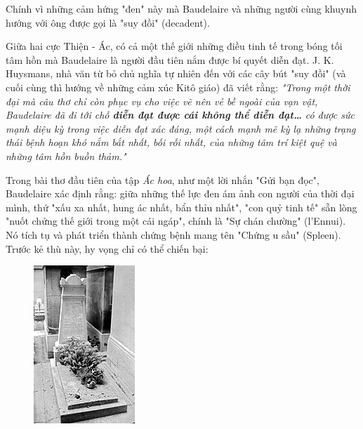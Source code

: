 \documentclass[../main.tex]{subfiles}
\begin{document}
\begin{multicols}{2}
Chính vì những cảm hứng "đen" này mà Baudelaire và những người cùng khuynh hướng với ông được gọi là "suy đồi" (decadent). 
 
Giữa hai cực Thiện - Ác, có cả một thế giới những điều tinh tế trong bóng tối tâm hồn mà Baudelaire là người đầu tiên nắm được bí quyết diễn đạt. J. K. Huysmans, nhà văn từ bỏ chủ nghĩa tự nhiên đến với các cây bút "suy đồi" (và cuối cùng thì hướng về những cảm xúc Kitô giáo) đã viết rằng: \textit{"Trong một thời đại mà câu thơ chỉ còn phục vụ cho việc vẽ nên vẻ bề ngoài của vạn vật, Baudelaire đã đi tới chỗ \textbf{diễn đạt được cái không thể diễn đạt… }có được sức mạnh diệu kỳ trong việc diễn đạt xác đáng, một cách mạnh mẽ kỳ lạ những trạng thái bệnh hoạn khó nắm bắt nhất, bối rối nhất, của những tâm trí kiệt quệ và những tâm hồn buồn thảm."} 
 
Trong bài thơ đầu tiên của tập \textit{Ác hoa}, như một lời nhắn "Gửi bạn đọc", Baudelaire xác định rằng: giữa những thế lực đen ám ảnh con người của thời đại mình, thứ "xấu xa nhất, hung ác nhất, bẩn thỉu nhất", "con quỷ tinh tế" sẵn lòng "nuốt chửng thế giới trong một cái ngáp", chính là "Sự chán chường" (l'Ennui). 
Nó tích tụ và phát triển thành chứng bệnh mang tên "Chứng u sầu" (Spleen). Trước kẻ thù này, hy vọng chỉ có thể chiến bại: 
 \begin{figure}
	\centering
	\includegraphics[width=\textwidth]{../img/tho080708_4.jpg}

\end{figure}
\end{multicols}
\end{document}
